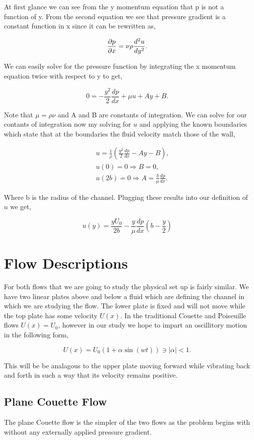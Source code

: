 \documentclass[a4paper,12pt,titlepage]{article}
\begin{document}
At first glance we can see from the y momentum equation that p is not a function of y.  From the second equation we see that pressure gradient is a constant function in x since it can be rewritten as,

\[
\frac{\partial p}{\partial x} = \nu \rho \frac{d^2 u}{dy^2}.
\]

We can easily solve for the pressure function by integrating the x momentum equation twice with respect to y to get,

\[
0 = -\frac{y^2}{2}\frac{dp}{dx} + \mu u + A y + B.
\]

Note that $\mu = \rho \nu$ and A and B are constants of integration.  We can solve for our contants of integration now my solving for $u$ and applying the known boundaries which state that at the boundaries the fluid velocity match those of the wall,

\begin{eqnarray}
&& u = \frac{1}{\rho} \left( \frac{y^2}{2} \frac{dp}{dx} - Ay -B \right),\nonumber \\
&& u(0) = 0 \Rightarrow B = 0, \nonumber \\
&& u(2b) = 0 \Rightarrow A = \frac{b}{\mu} \frac{dp}{dx}.
\end{eqnarray}

Where b is the radius of the channel.  Plugging these results into our definition of $u$ we get,

\[
u(y) = \frac{yU_0}{2b} - \frac{y}{\mu} \frac{dp}{dx}\left(b-\frac{y}{2}\right)
\]

\section{Flow Descriptions}

For both flows that we are going to study the physical set up is fairly similar.  We have two linear plates above and below a fluid which are defining the channel in which we are studying the flow.  The lower plate is fixed and will not move while the top plate has some velocity $U(x)$.  In the traditional Couette and Poiseuille flows $U(x) = U_0$, however in our study we hope to impart an oscillitory motion in the following form,

\[
U(x) = U_0(1+\alpha \sin(wt)) \ni |\alpha| < 1.
\]

This will be be analagous to the upper plate moving forward while vibrating back and forth in such a way that its velocity remains positive.  

\subsection{Plane Couette Flow}
The plane Couette flow is the simpler of the two flows as the problem begins with without any externally applied pressure gradient.  




\end{document}
